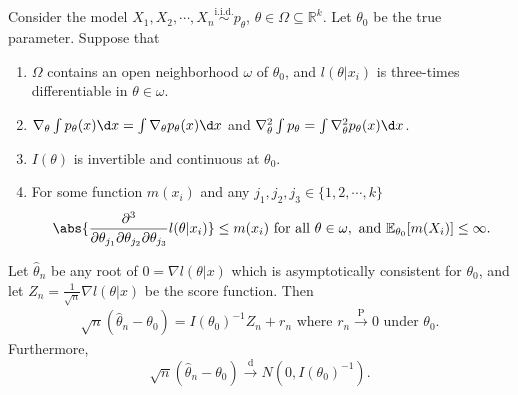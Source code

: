 \documentclass[a4paper]{article}
\begin{document}
\newpage
\begin{thm}
	Consider the model $X_1,X_2,\cdots,X_n \stackrel{\text{i.i.d.}}{\sim}p_{\theta}$, $\theta \in \Omega \subseteq \mathbb{R}^k$. Let $\theta_0$ be the true parameter. Suppose that
	\begin{enumerate}
		\item $\Omega$ contains an open neighborhood $\omega$ of $\theta_0$, and $l(\theta|x_i)$ is three-times differentiable in $\theta \in \omega$.
		\item $\nabla_{\theta} \int p_{\theta}(x) \d x = \int \nabla_{\theta} p_{\theta}(x) \d x$ and $\nabla_{\theta}^2 \int p_{\theta} = \int \nabla_{\theta}^2 p_{\theta}(x) \d x$.
		\item $I(\theta)$ is invertible and continuous at $\theta_0$.
		\item For some function $m(x_i)$ and any $j_1,j_2,j_3 \in \{1,2,\cdots,k\}$
		\begin{equation*}
			\abs{\frac{\partial^3}{\partial\theta_{j_1}\partial\theta_{j_2}\partial\theta_{j_3}} l(\theta|x_i)} \leq m(x_i) \text{ for all } \theta \in \omega, \text{ and } \mathbb{E}_{\theta_0}[m(X_i)] \leq \infty.
		\end{equation*}
	\end{enumerate}
	Let $\hat{\theta}_n$ be any root of $0 = \nabla l(\theta|x)$ which is asymptotically consistent for $\theta_0$, and let $Z_n = \frac{1}{\sqrt{n}} \nabla l(\theta|x)$ be the score function. Then
	\begin{equation}
		\begin{aligned}
			\sqrt{n}(\hat{\theta}_n - \theta_0) = I(\theta_0)^{-1} Z_n + r_n \text{ where } r_n \stackrel{\text{P}}{\longrightarrow} 0 \text{ under } \theta_0.
		\end{aligned}
	\end{equation}
	Furthermore,
	\begin{equation}
		\sqrt{n}(\hat{\theta}_n - \theta_0) \stackrel{\text{d}}{\longrightarrow} N(0,I(\theta_0)^{-1}).
	\end{equation}
\end{thm}
\end{document}
